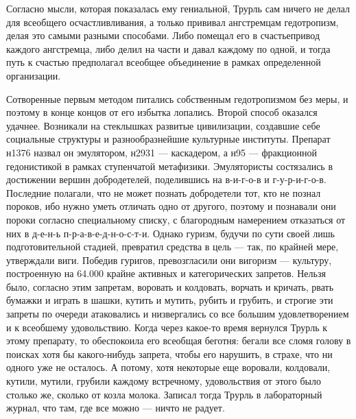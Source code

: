 Согласно мысли, которая показалась ему гениальной, Трурль
сам ничего не делал для всеобщего осчастливливания, а только
прививал ангстремцам гедотропизм, делая это самыми разными
способами. Либо помещал его в счастьепривод каждого
ангстремца, либо делил на части и давал каждому по одной, и
тогда путь к счастью предполагал всеобщее объединение в
рамках определенной организации.

Сотворенные первым методом питались собственным
гедотропизмом без меры, и поэтому в конце концов от его
избытка лопались. Второй способ оказался удачнее. Возникали
на стеклышках развитые цивилизации, создавшие себе
социальные структуры и разнообразнейшие культурные
институты. Препарат н1376 назвал он эмулятором, н2931 --- каскадером,
а н95 --- фракционной гедонистикой в рамках
ступенчатой метафизики. Эмулятористы состязались в
достижении вершин добродетелей, поделившись на в-и-г-о-в и
г-у-р-и-г-о-в. Последние полагали, что не может познать
добродетели тот, кто не познал пороков, ибо нужно уметь
отличать одно от другого, поэтому и познавали они пороки
согласно специальному списку, с благородным намерением
отказаться от них в д-е-н-ь п-р-а-в-е-д-н-о-с-т-и. Однако
гуризм, будучи по сути своей лишь подготовительной стадией,
превратил средства в цель --- так, по крайней мере, утверждали
виги. Победив гуригов, превозгласили они вигоризм --- культуру,
построенную на 64.000 крайне активных и
категорических запретов. Нельзя было, согласно этим
запретам, воровать и колдовать, ворчать и кричать, рвать
бумажки и играть в шашки, кутить и мутить, рубить и грубить,
и строгие эти запреты по очереди атаковались и низвергались
со все большим удовлетворением и к всеобшему удовольствию.
Когда через какое-то время вернулся Трурль к этому
препарату, то обеспокоила его всеобщая беготня: бегали все
сломя голову в поисках хотя бы какого-нибудь запрета, чтобы
его нарушить, в страхе, что ни одного уже не осталось. А
потому, хотя некоторые еще воровали, колдовали, кутили,
мутили, грубили каждому встречному, удовольствия от этого
было столько же, сколько от козла молока. Записал тогда
Трурль в лабораторный журнал, что там, где все можно --- ничто
не радует.

